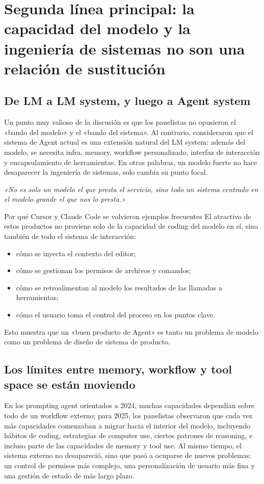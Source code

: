 \section{Segunda línea principal: la capacidad del modelo y la ingeniería de sistemas no son una relación de sustitución}

\subsection{De LM a LM system, y luego a Agent system}
Un punto muy valioso de la discusión es que los panelistas no opusieron el «bando del modelo» y el «bando del sistema». Al contrario, consideraron que el sistema de Agent actual es una extensión natural del LM system: además del modelo, se necesita infra, memory, workflow personalizado, interfaz de interacción y encapsulamiento de herramientas. En otras palabras, un modelo fuerte no hace desaparecer la ingeniería de sistemas, solo cambia su punto focal.

\textit{«No es solo un modelo el que presta el servicio, sino todo un sistema centrado en el modelo grande el que nos lo presta.»}

\begin{importantbox}{Por qué Cursor y Claude Code se volvieron ejemplos frecuentes}
El atractivo de estos productos no proviene solo de la capacidad de coding del modelo en sí, sino también de todo el sistema de interacción:
\begin{itemize}
  \item cómo se inyecta el contexto del editor;
  \item cómo se gestionan los permisos de archivos y comandos;
  \item cómo se retroalimentan al modelo los resultados de las llamadas a herramientas;
  \item cómo el usuario toma el control del proceso en los puntos clave.
\end{itemize}
Esto muestra que un «buen producto de Agent» es tanto un problema de modelo como un problema de diseño de sistema de producto.
\end{importantbox}

\subsection{Los límites entre memory, workflow y tool space se están moviendo}
En los prompting agent orientados a 2024, muchas capacidades dependían sobre todo de un workflow externo; para 2025, los panelistas observaron que cada vez más capacidades comenzaban a migrar hacia el interior del modelo, incluyendo hábitos de coding, estrategias de computer use, ciertos patrones de reasoning, e incluso parte de las capacidades de memory y tool use. Al mismo tiempo, el sistema externo no desapareció, sino que pasó a ocuparse de nuevos problemas: un control de permisos más complejo, una personalización de usuario más fina y una gestión de estado de más largo plazo.

